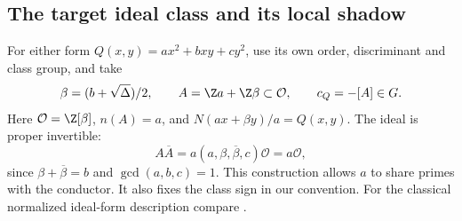 \subsection{The target ideal class and its local shadow}

For either form \(Q(x,y)=ax^2+bxy+cy^2\), use its own order,
discriminant and class group, and take
\[
 \beta=(b+\sqrt\Delta)/2,\qquad
 A=\Z a+\Z\beta\subset\mathcal O,\qquad c_Q=-[A]\in G.
\]
Here \(\mathcal O=\Z[\beta]\), \(n(A)=a\), and
\(N(ax+\beta y)/a=Q(x,y)\). The ideal is proper invertible:
\[
 A\overline A=a(a,\beta,\overline\beta,c)\mathcal O=a\mathcal O,
\]
since \(\beta+\overline\beta=b\) and \(\gcd(a,b,c)=1\).
This construction allows \(a\) to share primes with the conductor.
It also fixes the class sign in our convention. For the classical
normalized ideal-form description compare
\cite[Lemma 10.2]{khayutin}.

